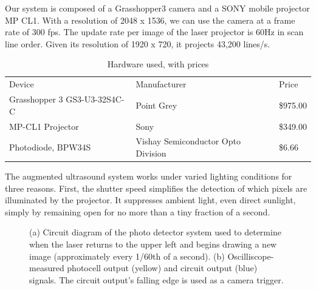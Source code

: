 \documentclass{llncs}
\begin{document}
Our system is composed of a Grasshopper3 camera and a SONY mobile projector MP CL1. With a resolution of 2048 x 1536, we can use the camera at a frame rate of 300 fps. The update rate per image of the laser projector is 60Hz in scan line order. Given its resolution of 1920 x 720, it projects 43,200 lines/s.
\begin{table}
\caption{Hardware used, with prices}
\begin{tabular}{lll}
\hline\noalign{\smallskip}
Device & Manufacturer & Price \\ \noalign{\smallskip}\hline\noalign{\smallskip} 
Grasshopper 3 GS3-U3-32S4C-C & Point Grey &  \$975.00\\ 
MP-CL1 Projector & Sony & \$349.00 \\ 
Photodiode, BPW34S & Vishay Semiconductor Opto Division & \$6.66 \\ \hline
\end{tabular}
\end{table}

The augmented ultrasound system works under varied lighting conditions for three reasons. First, the shutter speed simplifies the detection of which pixels are illuminated by the projector. It suppresses ambient light, even direct sunlight, simply by remaining open for no more than a tiny fraction of a second.

\begin{figure}[h]
\centering
{}\hfill%
\caption{
(a) Circuit diagram of the photo detector system used to determine when the laser returns to the upper left and begins drawing a new image (approximately every 1/60th of a second). (b) Oscilliscope-measured photocell output (yellow) and circuit output (blue) signals.  The circuit output's falling edge is used as a camera trigger.
}
\end{figure}
\end{document}
